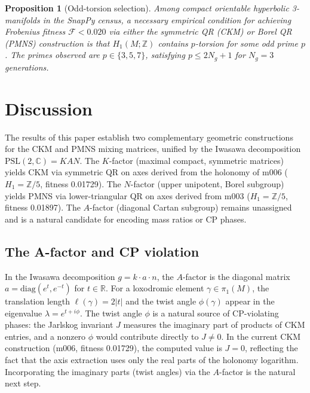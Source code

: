 \documentclass[floatfix,aps,prd,twocolumn,showpacs,superscriptaddress,longbibliography]{revtex4-2}
\newtheorem{proposition}{Proposition}
\newcommand{\PSL}{\mathrm{PSL}(2,\mathbb{C})}
\begin{document}
\begin{proposition}[Odd-torsion selection]
\label{prop:oddtorsion}
Among compact orientable hyperbolic 3-manifolds in the SnapPy census,
a necessary empirical condition for achieving Frobenius fitness
$\mathcal{F} < 0.020$ via either the symmetric QR \emph{(CKM)} or
Borel QR \emph{(PMNS)} construction is that $H_1(M;\mathbb{Z})$
contains $p$-torsion for some odd prime $p$.
The primes observed are $p \in \{3, 5, 7\}$, satisfying
$p \leq 2N_g + 1$ for $N_g = 3$ generations.
\end{proposition}

\section{Discussion}
\label{sec:discussion}

The results of this paper establish two complementary geometric
constructions for the CKM and PMNS mixing matrices, unified by the
Iwasawa decomposition $\PSL = KAN$.
The $K$-factor (maximal compact, symmetric matrices) yields CKM
via symmetric QR on axes derived from the holonomy of m006
($H_1 = \mathbb{Z}/5$, fitness 0.01729).
The $N$-factor (upper unipotent, Borel subgroup) yields PMNS
via lower-triangular QR on axes derived from m003
($H_1 = \mathbb{Z}/5$, fitness 0.01897).
The $A$-factor (diagonal Cartan subgroup) remains unassigned and
is a natural candidate for encoding mass ratios or CP phases.

\subsection{The A-factor and CP violation}

In the Iwasawa decomposition $g = k \cdot a \cdot n$, the $A$-factor
is the diagonal matrix $a = \mathrm{diag}(e^t, e^{-t})$ for $t \in \mathbb{R}$.
For a loxodromic element $\gamma \in \pi_1(M)$, the translation
length $\ell(\gamma) = 2|t|$ and the twist angle $\phi(\gamma)$
appear in the eigenvalue $\lambda = e^{t + i\phi}$.
The twist angle $\phi$ is a natural source of CP-violating phases:
the Jarlskog invariant $J$ measures the imaginary part of products
of CKM entries, and a nonzero $\phi$ would contribute directly
to $J \neq 0$.
In the current CKM construction (m006, fitness 0.01729), the
computed value is $J = 0$, reflecting the fact that the axis
extraction uses only the real parts of the holonomy logarithm.
Incorporating the imaginary parts (twist angles) via the $A$-factor
is the natural next step.
\end{document}
